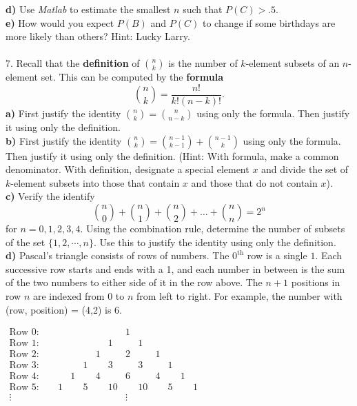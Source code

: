 \documentclass[12pt]{article}
\begin{document}
{\bf d)} Use {\em Matlab} to estimate the smallest $n$ such that $P(C) > .5$. \\
{\bf e)} How would you expect $P(B)$ and $P(C)$ to change if some birthdays are more likely than others?  Hint: Lucky Larry. \\ \\
7. Recall that the {\bf definition} of $\binom{n}{k}$ is the number of $k$-element subsets of an $n$-element set.  This can be computed by the {\bf formula} $$\binom{n}{k} = \frac{n!}{k!(n-k)!}.$$
{\bf a)} First justify the identity $\binom{n}{k} = \binom{n}{n-k}$ using only the formula.  Then justify it using only the definition. \\
{\bf b)} First justify the identity $\binom{n}{k} = \binom{n-1}{k-1} + \binom{n-1}{k}$ using only the formula.  Then justify it using only the definition. (Hint: With formula, make a common denominator.  With definition, designate a special element $x$ and divide the set of $k$-element subsets into those that contain $x$ and those that do not contain $x$). \\
{\bf c)} Verify the identify
$$\binom{n}{0} + \binom{n}{1} + \binom{n}{2} + \dots + \binom{n}{n} = 2^n$$
for $n = 0,1,2,3,4$.  Using the combination rule, determine the number of subsets of the set $\{1,2,\cdots,n\}$.  Use this to justify the identity using only the definition. \\
{\bf d)} Pascal's triangle consists of rows of numbers.  The $0^\text{th}$ row is a single $1$.  Each successive row starts and ends with a 1, and each number in between is the sum of the two numbers to either side of it in the row above.  The $n+1$ positions in row $n$ are indexed from $0$ to $n$ from left to right.  For example, the number with (row, position) = (4,2) is 6. \\
\begin{center}
$\begin{array}{cccccccccccc}
\text{Row } 0: \quad & & &  &  & & 1 &  &  &  &  & \\
\text{Row } 1: \quad & & &  & & 1 &  & 1 &  &  & &\\ 
\text{Row } 2: \quad & & & & 1 & & 2 & & 1 & & &\\
\text{Row } 3: \quad & & & 1 & & 3 & & 3 & & 1 & & \\
\text{Row } 4: \quad & & 1 & & 4 & & 6 & & 4 & & 1 &\\
\text{Row } 5: \quad & 1 & & 5 & & 10 & & 10 & & 5 & & 1\\
\vdots \quad  \quad &&&&&&\vdots &&&&& \\
\end{array}$
\end{center}
\end{document}
